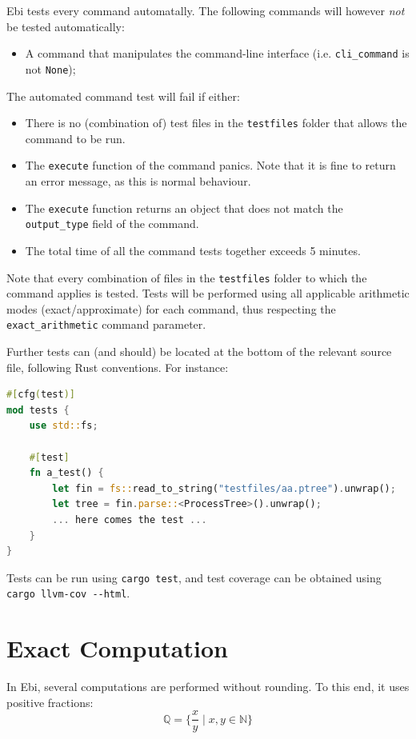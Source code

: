 \documentclass{book}
\begin{document}
            Ebi tests every command automatally.
            The following commands will however \emph{not} be tested automatically:
            \begin{itemize}
                \item A command that manipulates the command-line interface (i.e. \verb=cli_command= is not \verb=None=);
            \end{itemize}
            The automated command test will fail if either:
            \begin{itemize}
                \item There is no (combination of) test files in the \verb=testfiles= folder that allows the command to be run.
                \item The \verb=execute= function of the command panics.
                Note that it is fine to return an error message, as this is normal behaviour.
                \item The \verb=execute= function returns an object that does not match the \verb=output_type= field of the command.
                \item The total time of all the command tests together exceeds 5 minutes.
            \end{itemize}
            Note that every combination of files in the \verb=testfiles= folder to which the command applies is tested.
            Tests will be performed using all applicable arithmetic modes (exact/approximate) for each command, thus respecting the \verb=exact_arithmetic= command parameter.

            Further tests can (and should) be located at the bottom of the relevant source file, following Rust conventions.
            For instance:
\begin{lstlisting}[language=Rust, style=boxed]
#[cfg(test)]
mod tests {
    use std::fs;

    #[test]
    fn a_test() {
        let fin = fs::read_to_string("testfiles/aa.ptree").unwrap();
        let tree = fin.parse::<ProcessTree>().unwrap();
        ... here comes the test ...
    }
}
\end{lstlisting}

            Tests can be run using \verb=cargo test=, and test coverage can be obtained using \verb=cargo llvm-cov --html=.
		

    \section{Exact Computation}
    \label{sec:exact}
        In Ebi, several computations are performed without rounding.
        To this end, it uses positive fractions: 
        $$\mathbb{Q} = \{ \frac{x}{y} \mid x, y \in \mathbb{N} \}$$
    
\end{document}
